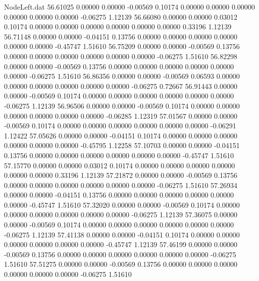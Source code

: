 \begin{filecontents}{NodeLeft.dat}
  56.61025    0.00000    0.00000    -0.00569    0.10174    0.00000    0.00000    0.00000    0.00000    0.00000    0.00000   -0.06275    1.12139
  56.66080    0.00000    0.00000     0.03012    0.10174    0.00000    0.00000    0.00000    0.00000    0.00000    0.00000    0.33196    1.12139
  56.71148    0.00000    0.00000    -0.04151    0.13756    0.00000    0.00000    0.00000    0.00000    0.00000    0.00000   -0.45747    1.51610
  56.75209    0.00000    0.00000    -0.00569    0.13756    0.00000    0.00000    0.00000    0.00000    0.00000    0.00000   -0.06275    1.51610
  56.82298    0.00000    0.00000    -0.00569    0.13756    0.00000    0.00000    0.00000    0.00000    0.00000    0.00000   -0.06275    1.51610
  56.86356    0.00000    0.00000    -0.00569    0.06593    0.00000    0.00000    0.00000    0.00000    0.00000    0.00000   -0.06275    0.72667
  56.91443    0.00000    0.00000    -0.00569    0.10174    0.00000    0.00000    0.00000    0.00000    0.00000    0.00000   -0.06275    1.12139
  56.96506    0.00000    0.00000    -0.00569    0.10174    0.00000    0.00000    0.00000    0.00000    0.00000    0.00000   -0.06285    1.12319
  57.01567    0.00000    0.00000    -0.00569    0.10174    0.00000    0.00000    0.00000    0.00000    0.00000    0.00000   -0.06291    1.12422
  57.05626    0.00000    0.00000    -0.04151    0.10174    0.00000    0.00000    0.00000    0.00000    0.00000    0.00000   -0.45795    1.12258
  57.10703    0.00000    0.00000    -0.04151    0.13756    0.00000    0.00000    0.00000    0.00000    0.00000    0.00000   -0.45747    1.51610
  57.15770    0.00000    0.00000     0.03012    0.10174    0.00000    0.00000    0.00000    0.00000    0.00000    0.00000    0.33196    1.12139
  57.21872    0.00000    0.00000    -0.00569    0.13756    0.00000    0.00000    0.00000    0.00000    0.00000    0.00000   -0.06275    1.51610
  57.26934    0.00000    0.00000    -0.04151    0.13756    0.00000    0.00000    0.00000    0.00000    0.00000    0.00000   -0.45747    1.51610
  57.32020    0.00000    0.00000    -0.00569    0.10174    0.00000    0.00000    0.00000    0.00000    0.00000    0.00000   -0.06275    1.12139
  57.36075    0.00000    0.00000    -0.00569    0.10174    0.00000    0.00000    0.00000    0.00000    0.00000    0.00000   -0.06275    1.12139
  57.41138    0.00000    0.00000    -0.04151    0.10174    0.00000    0.00000    0.00000    0.00000    0.00000    0.00000   -0.45747    1.12139
  57.46199    0.00000    0.00000    -0.00569    0.13756    0.00000    0.00000    0.00000    0.00000    0.00000    0.00000   -0.06275    1.51610
  57.51275    0.00000    0.00000    -0.00569    0.13756    0.00000    0.00000    0.00000    0.00000    0.00000    0.00000   -0.06275    1.51610

\end{filecontents}
